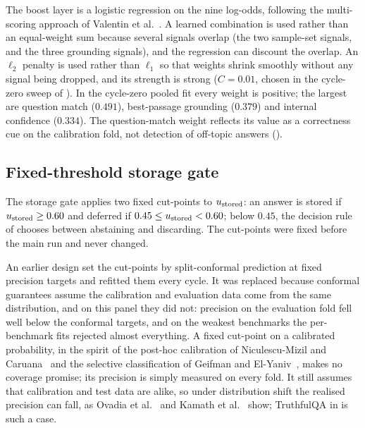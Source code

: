 The boost layer is a logistic regression on the nine log-odds, following the multi-scoring approach of Valentin et al.~\cite{valentin2024hallucination}. A learned combination is used rather than an equal-weight sum because several signals overlap (the two sample-set signals, and the three grounding signals), and the regression can discount the overlap. An $\ell_{2}$ penalty is used rather than $\ell_{1}$ so that weights shrink smoothly without any signal being dropped, and its strength is strong ($C = 0.01$, chosen in the cycle-zero sweep of ). In the cycle-zero pooled fit every weight is positive; the largest are question match ($0.491$), best-passage grounding ($0.379$) and internal confidence ($0.334$). The question-match weight reflects its value as a correctness cue on the calibration fold, not detection of off-topic answers ().

\subsection{Fixed-threshold storage gate}
\label{sec:conformal-gate}

The storage gate applies two fixed cut-points to $u_{\text{stored}}$: an answer is stored if $u_{\text{stored}} \ge 0.60$ and deferred if $0.45 \le u_{\text{stored}} < 0.60$; below $0.45$, the decision rule of  chooses between abstaining and discarding. The cut-points were fixed before the main run and never changed.

An earlier design set the cut-points by split-conformal prediction at fixed precision targets and refitted them every cycle. It was replaced because conformal guarantees assume the calibration and evaluation data come from the same distribution, and on this panel they did not: precision on the evaluation fold fell well below the conformal targets, and on the weakest benchmarks the per-benchmark fits rejected almost everything. A fixed cut-point on a calibrated probability, in the spirit of the post-hoc calibration of Niculescu-Mizil and Caruana~\cite{niculescu2005predicting} and the selective classification of Geifman and El-Yaniv~\cite{geifman2017selective}, makes no coverage promise; its precision is simply measured on every fold. It still assumes that calibration and test data are alike, so under distribution shift the realised precision can fall, as Ovadia et al.~\cite{ovadia2019trust} and Kamath et al.~\cite{kamath2020selective} show; TruthfulQA in  is such a case.

